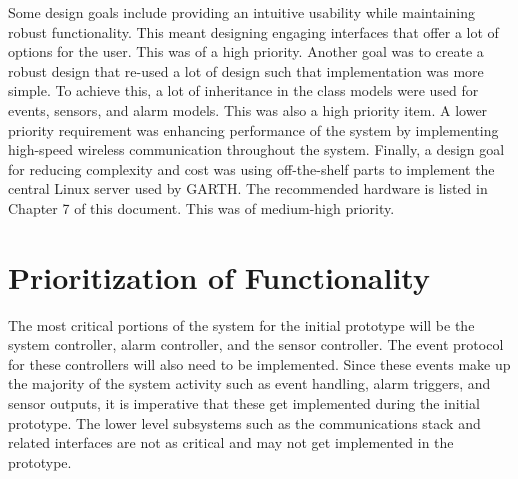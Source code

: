 \documentclass{report}
\begin{document}
Some design goals include providing an intuitive usability while maintaining
robust functionality. This meant designing engaging interfaces that offer a lot
of options for the user. This was of a high priority. Another goal was to create
a robust design that re-used a lot of design such that implementation was more
simple. To achieve this, a lot of inheritance in the class models were used for
events, sensors, and alarm models. This was also a high priority item. A lower
priority requirement was enhancing performance of the system by implementing
high-speed wireless communication throughout the system. Finally, a design goal
for reducing complexity and cost was using off-the-shelf parts to implement the
central Linux server used by GARTH. The recommended hardware is listed in 
Chapter 7 of this document. This was of medium-high priority.

\section{Prioritization of Functionality}

The most critical portions of the system for the initial prototype will be the 
system controller, alarm controller, and the sensor controller. The event 
protocol for these controllers will also need to be implemented. Since these
events make up the majority of the system activity such as event handling,
alarm triggers, and sensor outputs, it is imperative that these get implemented
during the initial prototype. The lower level subsystems such as the
communications stack and related interfaces are not as critical and may not
get implemented in the prototype.
\end{document}
